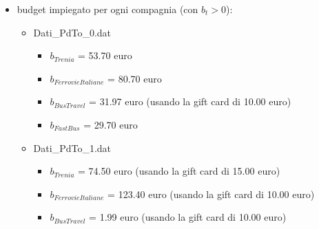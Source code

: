 \documentclass[main.tex]{subfiles}
\begin{document}
\begin{itemize}
\begin{itemize}
    \end{itemize}
    \item budget impiegato per ogni compagnia (con $b_t > 0$):
    \begin{itemize}
        \item Dati\_PdTo\_0.dat
        \begin{itemize}
            \item $b_{Trenia}$ = 53.70 euro
            \item $b_{FerrovieItaliane}$ = 80.70 euro
            \item $b_{BusTravel}$ =  31.97 euro (usando la gift card di 10.00 euro)
            \item $b_{FastBus}$ = 29.70 euro
        \end{itemize}
        \item Dati\_PdTo\_1.dat
        \begin{itemize}
            \item $b_{Trenia}$ = 74.50 euro (usando la gift card di 15.00 euro)
            \item $b_{FerrovieItaliane}$ = 123.40 euro (usando la gift card di 10.00 euro)
            \item $b_{BusTravel}$ = 1.99 euro (usando la gift card di 10.00 euro)
        \end{itemize}
    \end{itemize}
\end{itemize}
\end{document}
